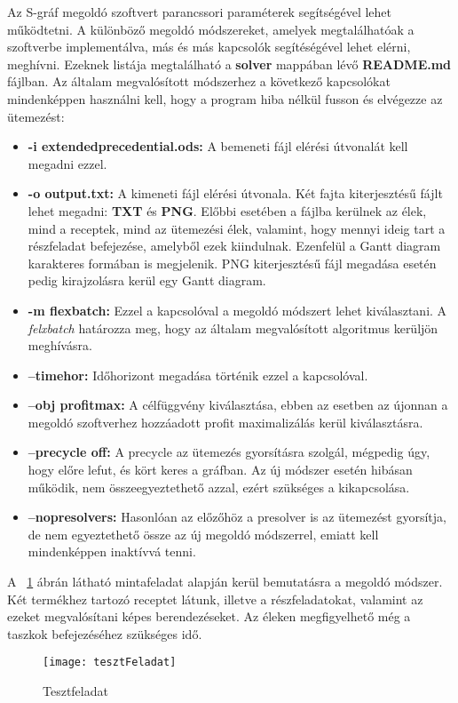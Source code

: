 Az S-gráf megoldó szoftvert parancssori paraméterek segítségével lehet működtetni. A különböző megoldó módszereket, amelyek megtalálhatóak a szoftverbe implementálva, más és más kapcsolók segítéségével lehet elérni, meghívni. Ezeknek listája megtalálható a \textbf{solver} mappában lévő \textbf{README.md} fájlban. Az általam megvalósított módszerhez a következő kapcsolókat mindenképpen használni kell, hogy a program hiba nélkül fusson és elvégezze az ütemezést:
\begin{itemize}
	\item \textbf{-i extended\textunderscore precedential.ods:} A bemeneti fájl elérési útvonalát kell megadni ezzel.
	\item \textbf{-o output.txt:} A kimeneti fájl elérési útvonala. Két fajta kiterjesztésű fájlt lehet megadni: \textbf{TXT} és \textbf{PNG}. Előbbi esetében a fájlba kerülnek az élek, mind a receptek, mind az ütemezési élek, valamint, hogy mennyi ideig tart a részfeladat befejezése, amelyből ezek kiindulnak. Ezenfelül a Gantt diagram karakteres formában is megjelenik. PNG kiterjesztésű fájl megadása esetén pedig kirajzolásra kerül egy Gantt diagram.
	\item \textbf{-m flexbatch:} Ezzel a kapcsolóval a megoldó módszert lehet kiválasztani. A \textit{felxbatch} határozza meg, hogy az általam megvalósított algoritmus kerüljön meghívásra.
	\item \textbf{--timehor:} Időhorizont megadása történik ezzel a kapcsolóval.
	\item \textbf{--obj profit\textunderscore max:} A célfüggvény kiválasztása, ebben az esetben az újonnan a megoldó szoftverhez hozzáadott profit maximalizálás kerül kiválasztásra.
	\item \textbf{--precycle off:} A precycle az ütemezés gyorsításra szolgál, mégpedig úgy, hogy előre lefut, és kört keres a gráfban. Az új módszer esetén hibásan működik, nem összeegyeztethető azzal, ezért szükséges a kikapcsolása.
	\item \textbf{--nopresolvers:} Hasonlóan az előzőhöz a presolver is az ütemezést gyorsítja, de nem egyeztethető össze az új megoldó módszerrel, emiatt kell mindenképpen inaktívvá tenni.
\end{itemize}

A ~\ref{tesztFeladat} ábrán látható mintafeladat alapján kerül bemutatásra a megoldó módszer. Két termékhez tartozó receptet látunk, illetve a részfeladatokat, valamint az ezeket megvalósítani képes berendezéseket. Az éleken megfigyelhető még a taszkok befejezéséhez szükséges idő.
\begin{figure}[H]
\begin{center}
\texttt{[image: tesztFeladat]}
\caption{Tesztfeladat}
\label{tesztFeladat}
\end{center}
\end{figure}

